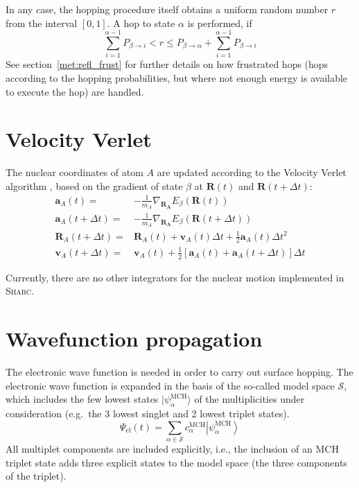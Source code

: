 \documentclass[a4paper,10pt,DIV=15,openany,twoside=false]{scrbook}
\newcommand{\sharc}{\textsc{Sharc}}
\newcommand{\VEC}[1]{\ensuremath{\mathbf{#1}}}
\begin{document}
In any case, the hopping procedure itself obtains a uniform random number $r$ from the interval $[0,1]$. A hop to state $\alpha$ is performed, if
\begin{equation}
  \sum\limits_{i=1}^{\alpha-1} P_{\beta\rightarrow i} < r \le P_{\beta\rightarrow\alpha}+\sum\limits_{i=1}^{\alpha-1} P_{\beta\rightarrow i}
  \label{eq:cumuprob}
\end{equation}
See section~\ref{met:refl_frust} for further details on how frustrated hops (hops according to the hopping probabilities, but where not enough energy is available to execute the hop) are handled.


\section{Velocity Verlet}

The nuclear coordinates of atom $A$ are updated according to the Velocity Verlet algorithm \cite{Verlet1967PR}, based on the gradient of state $\beta$ at $\VEC{R}(t)$ and $\VEC{R}(t+\Delta t)$:
\begin{align}
  \VEC{a}_A(t)=&
  -\frac{1}{m_A}\nabla_{\VEC{R_A}}E_\beta(\VEC{R}(t))\\
  \VEC{a}_A(t+\Delta t)=&
  -\frac{1}{m_A}\nabla_{\VEC{R_A}}E_\beta(\VEC{R}(t+\Delta t))\\
  \VEC{R}_A(t+\Delta t)=&
  \VEC{R}_A(t)+\VEC{v}_A(t)\Delta t + \frac{1}{2}\VEC{a}_A(t)\Delta t^2\\
  \VEC{v}_A(t+\Delta t)=&
  \VEC{v}_A(t)+\frac{1}{2}\left[\VEC{a}_A(t)+\VEC{a}_A(t+\Delta t)\right]\Delta t
\end{align}

Currently, there are no other integrators for the nuclear motion implemented in \sharc.


\section{Wavefunction propagation}\label{met:propagate}

The electronic wave function is needed in order to carry out surface hopping. The electronic wave function is expanded in the basis of the so-called model space $\mathcal{S}$, which includes the few lowest states $|\psi^{\text{MCH}}_\alpha\rangle$ of the multiplicities under consideration (e.g.\ the 3 lowest singlet and 2 lowest triplet states). 
\begin{equation}
  \Psi_{\text{el}}(t)=\sum\limits_{\alpha\in\mathcal{S}} c^{\text{MCH}}_\alpha \left|\psi^{\text{MCH}}_\alpha\right\rangle
\end{equation}
All multiplet components are included explicitly, i.e., the inclusion of an MCH triplet state adds three explicit states to the model space (the three components of the triplet).
\end{document}
